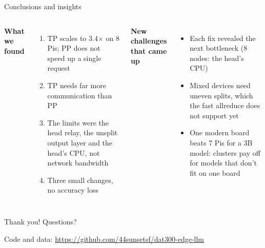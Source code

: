 \documentclass[aspectratio=169,11pt]{beamer}
\begin{document}
\begin{frame}{Conclusions and insights}
\begin{columns}[T]
\textbf{What we found}
\begin{enumerate}
\item TP scales to 3.4$\times$ on 8 Pis; PP does not speed up a single request
\item TP needs far more communication than PP
\item The limits were the head relay, the unsplit output layer and the head's CPU, not network bandwidth
\item Three small changes, no accuracy loss
\end{enumerate}
\textbf{New challenges that came up}
\begin{itemize}
\item Each fix revealed the next bottleneck (8 nodes: the head's CPU)
\item Mixed devices need uneven splits, which the fast allreduce does not support yet
\item One modern board beats 7 Pis for a 3B model: clusters pay off for models that don't fit on one board
\end{itemize}
\end{columns}
\end{frame}

\begin{frame}
\centering\Large Thank you! Questions?

\vfill
{\tiny\color{gray} Code and data: \url{https://github.com/44sunsetsf/dat300-edge-llm}}
\end{frame}
\end{document}
